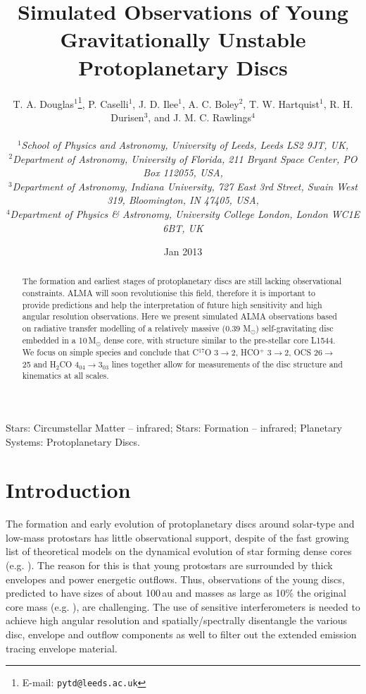 \documentclass[useAMS,usenatbib]{mn2e}
\title[Young protoplanetary discs]{Simulated Observations of Young Gravitationally Unstable Protoplanetary Discs}
\author[T.~A.~Douglas et al.]
{\parbox{\textwidth}{T. A. Douglas$^{1}$\thanks{E-mail: \texttt{pytd@leeds.ac.uk}},
P. Caselli$^{1}$,
J. D. Ilee$^{1}$,
A. C. Boley$^{2}$,
T. W. Hartquist$^{1}$,
R. H. Durisen$^{3}$, and
J. M. C. Rawlings$^{4}$\\
\vspace{0.1cm}\\
{\small{\it$^{1}$School of Physics and Astronomy, University of Leeds, Leeds LS2 9JT, UK,}} \\
{\small{\it$^{2}$Department of Astronomy, University of Florida, 211 Bryant Space Center, PO Box 112055, USA,}}\\
{\small{\it$^{3}$Department of Astronomy, Indiana University, 727 East 3rd Street, Swain West 319, Bloomington, IN 47405, USA,}}\\
{\small{\it$^{4}$Department of Physics \& Astronomy, University College London, London WC1E 6BT, UK}}\\}}
\begin{document}
\date{Jan 2013}

\pagerange{\pageref{firstpage}--\pageref{lastpage}} 

\maketitle

\label{firstpage}

\begin{abstract}
The formation and earliest stages of protoplanetary discs are still lacking observational constraints. ALMA will soon revolutionise this field, therefore it is important to provide predictions and help the interpretation of future high sensitivity and high angular resolution observations. Here we present simulated ALMA observations based on radiative transfer modelling of a relatively massive (0.39 M$_{\odot}$) self-gravitating disc embedded in a 10\,M$_{\odot}$ dense core, with structure similar to the pre-stellar core L1544. We focus on simple species and conclude that  C$^{17}$O 3$\rightarrow$2, HCO$^+$ 3$\rightarrow$2, OCS 26$\rightarrow$25 and H$_2$CO 4$_{04}\rightarrow$3$_{03}$ lines together allow for measurements of the disc structure and kinematics at all scales. 
\end{abstract}

\begin{keywords}
Stars: Circumstellar Matter -- infrared; Stars: Formation -- infrared; Planetary Systems: Protoplanetary Discs.
\end{keywords}

\section{Introduction}

The formation and early evolution of protoplanetary discs around solar-type and low-mass protostars has little observational support, despite of the fast growing list of theoretical models on the dynamical evolution of star forming dense cores (e.g. \citealt{Krasnopolsky2011,Machida2011,Braiding2012,Joos2013}). The reason for this is that young protostars are surrounded by thick envelopes and power energetic outflows. Thus, observations of the young discs, predicted to have sizes of about 100\,au and masses as large as 10\% the original core mass (e.g. \citealt*{Joos2012,Hayfield2011,Machida2011}), are challenging. The use of sensitive interferometers is needed to achieve high angular resolution and spatially/spectrally disentangle the various disc, envelope and outflow components as well to filter out the extended emission tracing envelope material. \smallskip
\end{document}
